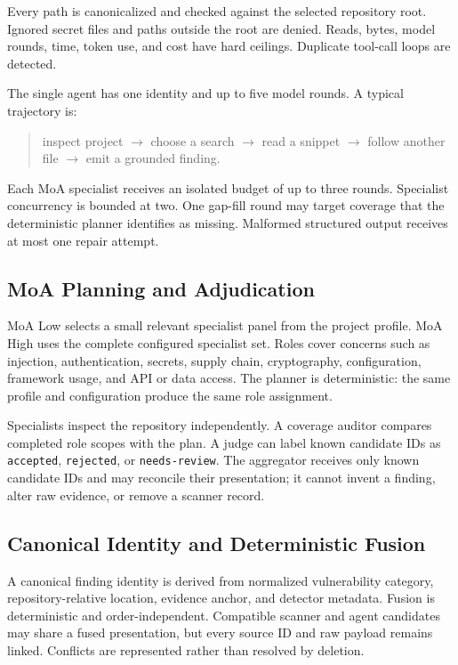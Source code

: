 \documentclass[sigconf,nonacm]{acmart}
\newcommand{\findingstate}[1]{\texttt{#1}}
\begin{document}
Every path is canonicalized and checked against the selected repository root. Ignored secret files and paths outside the root are denied. Reads, bytes, model rounds, time, token use, and cost have hard ceilings. Duplicate tool-call loops are detected.

The single agent has one identity and up to five model rounds. A typical trajectory is:

\begin{quote}
inspect project $\rightarrow$ choose a search $\rightarrow$ read a snippet
$\rightarrow$ follow another file $\rightarrow$ emit a grounded finding.
\end{quote}

Each MoA specialist receives an isolated budget of up to three rounds. Specialist concurrency is bounded at two. One gap-fill round may target coverage that the deterministic planner identifies as missing. Malformed structured output receives at most one repair attempt.

\subsection{MoA Planning and Adjudication}
MoA Low selects a small relevant specialist panel from the project profile. MoA High uses the complete configured specialist set. Roles cover concerns such as injection, authentication, secrets, supply chain, cryptography, configuration, framework usage, and API or data access. The planner is deterministic: the same profile and configuration produce the same role assignment.

Specialists inspect the repository independently. A coverage auditor compares completed role scopes with the plan. A judge can label known candidate IDs as \findingstate{accepted}, \findingstate{rejected}, or \findingstate{needs-review}. The aggregator receives only known candidate IDs and may reconcile their presentation; it cannot invent a finding, alter raw evidence, or remove a scanner record.

\subsection{Canonical Identity and Deterministic Fusion}
A canonical finding identity is derived from normalized vulnerability category, repository-relative location, evidence anchor, and detector metadata. Fusion is deterministic and order-independent. Compatible scanner and agent candidates may share a fused presentation, but every source ID and raw payload remains linked. Conflicts are represented rather than resolved by deletion.
\end{document}
